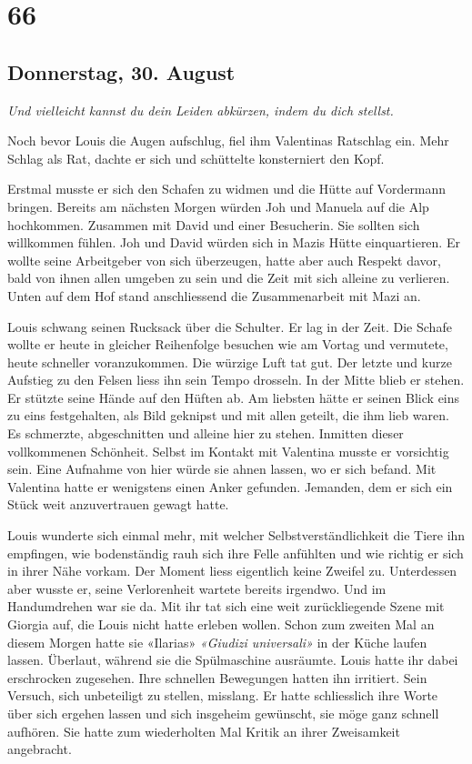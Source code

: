 \chapter{66}

\section{Donnerstag, 30. August}



\emph{Und vielleicht kannst du dein Leiden abkürzen, indem du dich stellst.}

Noch bevor Louis die Augen aufschlug, fiel ihm Valentinas Ratschlag ein. Mehr Schlag als Rat, dachte er sich und 
schüttelte konsterniert den Kopf.  

Erstmal musste er sich den Schafen zu widmen und die Hütte auf Vordermann 
bringen. Bereits am nächsten Morgen würden Joh und Manuela auf die Alp
hochkommen. Zusammen mit David und einer Besucherin. Sie sollten sich
willkommen fühlen. Joh und David würden sich in Mazis Hütte
einquartieren. Er wollte seine Arbeitgeber von sich überzeugen, hatte
aber auch Respekt davor, bald von ihnen allen umgeben zu sein und die
Zeit mit sich alleine zu verlieren. Unten auf dem Hof stand
anschliessend die Zusammenarbeit mit Mazi an.

\sectionbreak

Louis schwang seinen Rucksack über die Schulter. Er lag in der Zeit. Die
Schafe wollte er heute in gleicher Reihenfolge besuchen wie am Vortag
und vermutete, heute schneller voranzukommen. Die würzige Luft tat gut.
Der letzte und kurze Aufstieg zu den Felsen liess ihn sein Tempo
drosseln. In der Mitte blieb er stehen. Er stützte seine Hände auf den
Hüften ab. Am liebsten hätte er seinen Blick eins zu eins festgehalten, als Bild geknipst und mit allen geteilt,
die ihm lieb waren. Es schmerzte, abgeschnitten und alleine hier zu
stehen. Inmitten dieser vollkommenen Schönheit. Selbst im Kontakt mit
Valentina musste er vorsichtig sein. Eine Aufnahme von hier würde sie ahnen
lassen, wo er sich befand. Mit Valentina hatte er
wenigstens einen Anker gefunden. Jemanden, dem er sich ein Stück weit
anzuvertrauen gewagt hatte.

\sectionbreak

Louis wunderte sich einmal mehr, mit welcher Selbstverständlichkeit die Tiere ihn empfingen, wie bodenständig rauh sich ihre Felle anfühlten und wie richtig er sich in ihrer Nähe vorkam.
Der Moment liess eigentlich keine Zweifel zu. Unterdessen aber wusste er, seine Verlorenheit wartete bereits irgendwo. Und im Handumdrehen war sie da. Mit ihr tat sich eine weit zurückliegende Szene mit Giorgia auf, die Louis nicht hatte erleben wollen.
Schon zum zweiten Mal an diesem Morgen hatte sie «Ilarias»
\emph{«Giudizi universali»}  in der Küche laufen lassen. Überlaut, während sie die Spülmaschine ausräumte. Louis hatte ihr dabei erschrocken zugesehen. Ihre schnellen Bewegungen hatten ihn irritiert. Sein Versuch, sich unbeteiligt zu stellen, misslang. 
Er hatte schliesslich ihre Worte über sich ergehen lassen und sich insgeheim gewünscht, sie möge ganz schnell aufhören. Sie hatte zum wiederholten Mal Kritik an ihrer Zweisamkeit angebracht.


